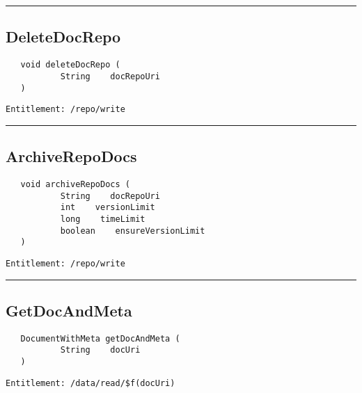 \rule{12cm}{2pt}
\subsection{DeleteDocRepo}
\label{Api:DeleteDocRepo}
\begin{Verbatim}
   void deleteDocRepo (
           String    docRepoUri
   )
\end{Verbatim}
\begin{Verbatim}[formatcom=\color{Maroon}]
  Entitlement: /repo/write
\end{Verbatim}



\rule{12cm}{2pt}
\subsection{ArchiveRepoDocs}
\label{Api:ArchiveRepoDocs}
\begin{Verbatim}
   void archiveRepoDocs (
           String    docRepoUri
           int    versionLimit
           long    timeLimit
           boolean    ensureVersionLimit
   )
\end{Verbatim}
\begin{Verbatim}[formatcom=\color{Maroon}]
  Entitlement: /repo/write
\end{Verbatim}



\rule{12cm}{2pt}
\subsection{GetDocAndMeta}
\label{Api:GetDocAndMeta}
\begin{Verbatim}
   DocumentWithMeta getDocAndMeta (
           String    docUri
   )
\end{Verbatim}
\begin{Verbatim}[formatcom=\color{Maroon}]
  Entitlement: /data/read/$f(docUri)
\end{Verbatim}



